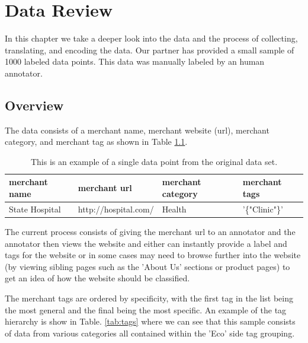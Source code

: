 \chapter{Data Review}

In this chapter we take a deeper look into the data and the process of collecting, translating, and encoding the data. Our partner has provided a small sample of 1000 labeled data points. This data was manually labeled by an human annotator. 

\section{Overview}

The data consists of a merchant name, merchant website (url), merchant category, and merchant tag as shown in Table \ref{tab:data_point}. 

\begin{table}[h]
\begin{tabular}{|l|l|l|l|}
\hline
merchant name            & merchant url            & merchant category & merchant tags           \\ \hline
State Hospital & http://hospital.com/ & Health   & '\{"Clinic"\}' \\ \hline
\end{tabular}
\caption{This is an example of a single data point from the original data set.}
\label{tab:data_point}
\end{table}


The current process consists of giving the merchant url to an annotator and the annotator then views the website and either can instantly  provide a label and tags for the website or in some cases may need to browse further into the website (by viewing sibling pages such as the 'About Us' sections or product pages) to get an idea of how the website should be classified. 

The merchant tags are ordered by specificity, with the first tag in the list being the most general and the final being the most specific. An example of the tag hierarchy is show in Table. \ref{tab:tags} where we can see that this sample consists of data from various categories all contained within the 'Eco' side tag grouping.


